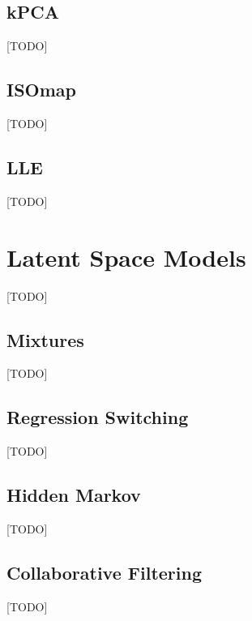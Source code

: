 \documentclass[12pt,a4paper]{article}
\theoremstyle{plain}
\theoremstyle{definition}
\begin{document}
\subsection{kPCA}
[TODO]

\subsection{ISOmap}
[TODO]


\subsection{LLE}
[TODO]


\section{Latent Space Models}
\label{sec:latent_space}
[TODO]


\subsection{Mixtures}
[TODO]


\subsection{Regression Switching}
[TODO]



\subsection{Hidden Markov}
[TODO]


\subsection{Collaborative Filtering}
[TODO]





\end{document}
